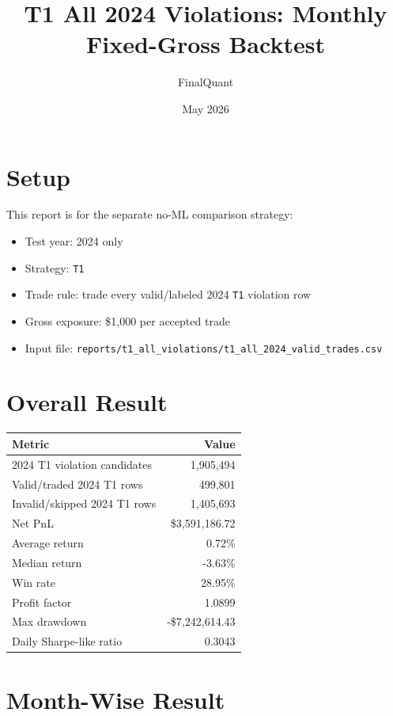 \documentclass[11pt]{article}
\title{T1 All 2024 Violations: Monthly Fixed-Gross Backtest}
\author{FinalQuant}
\date{May 2026}
\begin{document}
\maketitle

\section{Setup}

This report is for the separate no-ML comparison strategy:

\begin{itemize}
  \item Test year: 2024 only
  \item Strategy: \texttt{T1}
  \item Trade rule: trade every valid/labeled 2024 \texttt{T1} violation row
  \item Gross exposure: \$1,000 per accepted trade
  \item Input file: \texttt{reports/t1\_all\_violations/t1\_all\_2024\_valid\_trades.csv}
\end{itemize}

\section{Overall Result}

\begin{center}
\begin{tabular}{@{}lr@{}}
\toprule
Metric & Value \\
\midrule
2024 T1 violation candidates & 1,905,494 \\
Valid/traded 2024 T1 rows & 499,801 \\
Invalid/skipped 2024 T1 rows & 1,405,693 \\
Net PnL & \$3,591,186.72 \\
Average return & 0.72\% \\
Median return & -3.63\% \\
Win rate & 28.95\% \\
Profit factor & 1.0899 \\
Max drawdown & -\$7,242,614.43 \\
Daily Sharpe-like ratio & 0.3043 \\
\bottomrule
\end{tabular}
\end{center}

\section{Month-Wise Result}
\end{document}
